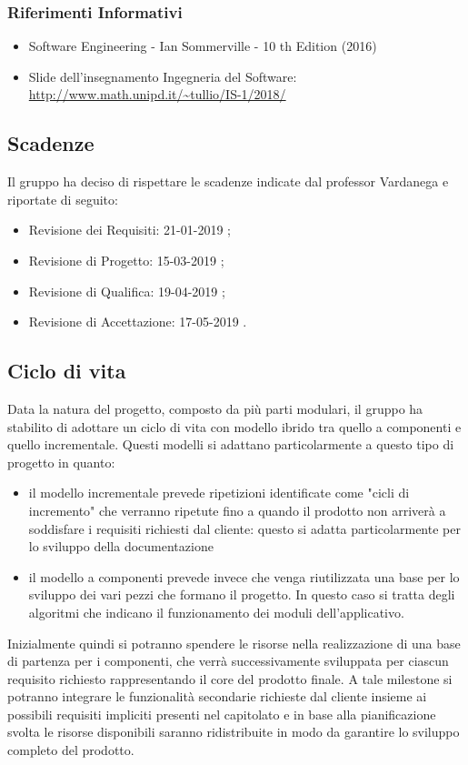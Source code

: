 		\subsubsection{Riferimenti Informativi}
			\begin{itemize}
				\item Software Engineering - Ian Sommerville - 10 th Edition (2016)
				\item Slide dell’insegnamento Ingegneria del Software:\\
				\url{http://www.math.unipd.it/~tullio/IS-1/2018/}
			\end{itemize}
		
	\subsection{Scadenze}
	Il gruppo ha deciso di rispettare le scadenze indicate dal professor Vardanega e riportate di seguito:
	\begin{itemize}
		\item Revisione dei Requisiti: 21-01-2019 ;
		\item Revisione di Progetto: 15-03-2019 ;
		\item Revisione di Qualifica: 19-04-2019 ;
		\item Revisione di Accettazione: 17-05-2019 .
	\end{itemize}
	
	\subsection{Ciclo di vita}
	Data la natura del progetto, composto da più parti modulari, il gruppo ha stabilito di adottare un ciclo di vita con modello ibrido tra quello a componenti e quello incrementale.
	Questi modelli si adattano particolarmente a questo tipo di progetto in quanto:
	\begin{itemize}
		\item il modello incrementale prevede ripetizioni identificate come "cicli di incremento" che verranno ripetute fino a quando il prodotto non arriverà a soddisfare i requisiti richiesti dal cliente: questo si adatta particolarmente per lo sviluppo della documentazione
		\item il modello a componenti prevede invece che venga riutilizzata una base per lo sviluppo dei vari pezzi che formano il progetto. In questo caso si tratta degli algoritmi che indicano il funzionamento dei moduli dell'applicativo.
	\end{itemize}
	Inizialmente quindi si potranno spendere le risorse nella realizzazione di una base di partenza per i componenti, che verrà successivamente sviluppata per ciascun requisito richiesto rappresentando il core del prodotto finale.
	A tale milestone si potranno integrare le funzionalità secondarie richieste dal cliente insieme ai possibili requisiti impliciti presenti nel capitolato e in base alla pianificazione svolta le risorse disponibili saranno ridistribuite in modo da garantire lo sviluppo completo del prodotto.
	
